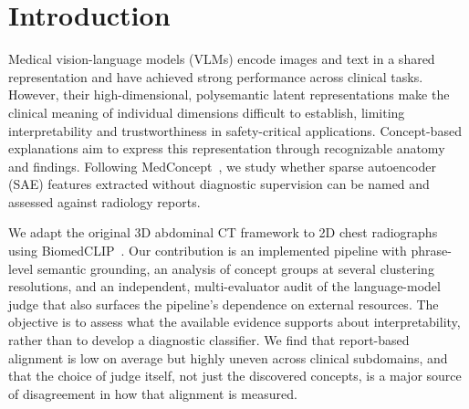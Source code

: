 \section{Introduction}
Medical vision-language models (VLMs) encode images and text in a shared representation and have achieved strong performance across clinical tasks. However, their high-dimensional, polysemantic latent representations make the clinical meaning of individual dimensions difficult to establish, limiting interpretability and trustworthiness in safety-critical applications. Concept-based explanations aim to express this representation through recognizable anatomy and findings. Following MedConcept~\cite{haque2026medconcept}, we study whether sparse autoencoder (SAE) features extracted without diagnostic supervision can be named and assessed against radiology reports.

We adapt the original 3D abdominal CT framework to 2D chest radiographs using BiomedCLIP~\cite{zhang2023biomedclip}. Our contribution is an implemented pipeline with phrase-level semantic grounding, an analysis of concept groups at several clustering resolutions, and an independent, multi-evaluator audit of the language-model judge that also surfaces the pipeline's dependence on external resources. The objective is to assess what the available evidence supports about interpretability, rather than to develop a diagnostic classifier. We find that report-based alignment is low on average but highly uneven across clinical subdomains, and that the choice of judge itself, not just the discovered concepts, is a major source of disagreement in how that alignment is measured.
